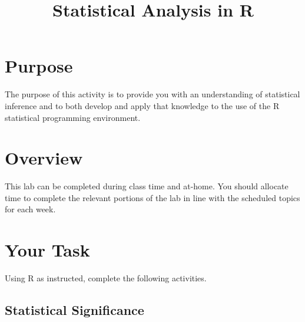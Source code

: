 \documentclass[a4paper,12pt]{article}
\title{Statistical Analysis in R}
\author{}
\date{}
\begin{document}
\vspace{-4em}

\maketitle

\vspace{-4em}

\section{Purpose}

The purpose of this activity is to provide you with an understanding of statistical inference and to both develop and apply that knowledge to the use of the R statistical programming environment.

\section{Overview}

This lab can be completed during class time and at-home. You should allocate time to complete the relevant portions of the lab in line with the scheduled topics for each week.

\section{Your Task}

Using R as instructed, complete the following activities.

\subsection{Statistical Significance}
\end{document}
